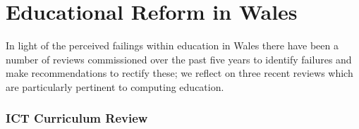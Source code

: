 \documentclass[conference]{IEEEtran}
\begin{document}
\section{Educational Reform in Wales}\label{welshedurefom}

In light of the perceived failings within education in Wales there
have been a number of reviews commissioned over the past five years
to identify failures and make recommendations to rectify these;
we reflect on three recent reviews which are particularly pertinent
to computing education.

\subsubsection*{ICT Curriculum Review}





\end{document}
